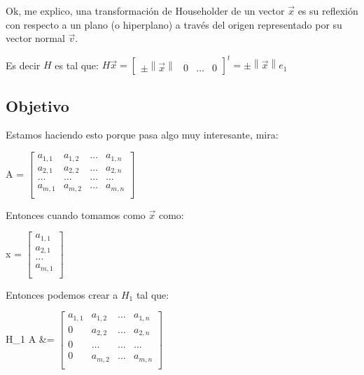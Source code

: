 \documentclass[12pt, fleqn]{report}                             %
\def \Eq {equation}                                             %
\newenvironment{MultiLineEquation*}[1]                          %
        {\begin{\Eq*}\begin{alignedat}{#1}}                         %
        {\end{alignedat}\end{\Eq*}}                                 %
\theoremstyle{break}                                            %
\newcommand{\Abs}[1]    {\left\lVert #1 \right\lVert}           %
\newcommand{\bVector}[1]                                        %
        { \ensuremath{\begin{bmatrix}#1\end{bmatrix}} }             %
\begin{document}
            Ok, me explico, una transformación de Householder de un vector $\vec x$ es su reflexión
            con respecto a un plano (o hiperplano) a través del origen representado por su vector normal
            $\vec v$.

            Es decir $H$ es tal que: 
            $H \vec x = \bVector{\pm \Abs{\vec x} & 0 & \dots & 0}^t = \pm \Abs{\vec x} e_1$

            \subsection{Objetivo}

                \begin{multicols}{2}
                    
                    Estamos haciendo esto porque pasa algo muy interesante, mira:
                    \begin{MultiLineEquation*}{3}
                        A = \bVector{
                            a_{1, 1} & a_{1, 2} & \dots & a_{1, n}\\
                            a_{2, 1} & a_{2, 2} & \dots & a_{2, n}\\
                            \dots    & \dots    & \dots & \dots   \\
                            a_{m, 1} & a_{m, 2} & \dots & a_{m, n}\\
                        }
                    \end{MultiLineEquation*}

                    Entonces cuando tomamos como $\vec x$ como:
                    \begin{MultiLineEquation*}{3}
                        \vec x = \bVector{
                            a_{1, 1} \\
                            a_{2, 1} \\
                            \dots    \\
                            a_{m, 1} \\
                        }
                    \end{MultiLineEquation*}

                    Entonces podemos crear a $H_1$ tal que:
                    \begin{MultiLineEquation*}{3}
                        H_1 A 
                            &= \bVector{
                                a_{1, 1} & a_{1, 2} & \dots & a_{1, n}\\
                                0        & a_{2, 2} & \dots & a_{2, n}\\
                                0        & \dots    & \dots & \dots   \\
                                0        & a_{m, 2} & \dots & a_{m, n}\\
                            }
                    \end{MultiLineEquation*}
                \end{multicols}
\end{document}
